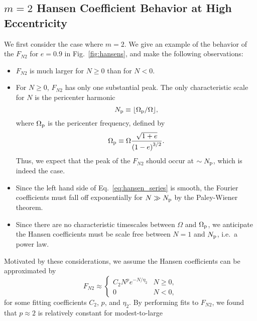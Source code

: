 \documentclass[
        fleqn,
        usenatbib,
    ]{mnras}
\newcommand*{\p}[1]{\left(#1\right)}
\begin{document}
\subsection{$m=2$ Hansen Coefficient Behavior at High Eccentricity}

We first consider the case where $m = 2$. We give an example of the behavior of
the $F_{N2}$ for $e = 0.9$ in Fig.~\ref{fig:hansens}, and make the following
observations:
\begin{itemize}
    \item $F_{N2}$ is much larger for $N \geq 0$ than for $N < 0$.

    \item For $N \geq 0$, $F_{N2}$ has only one substantial peak.
        The only characteristic scale for $N$ is the pericenter harmonic
        \begin{equation}
            N_{\rm p} \equiv \lfloor \Omega_{\rm p} / \Omega\rfloor,
        \end{equation}
        where $\Omega_{\rm p}$ is the pericenter frequency, defined by
        \begin{equation}
            \Omega_{\rm p} \equiv \Omega \frac{\sqrt{1 + e}}{\p{1 - e}^{3/2}}.
        \end{equation}
        Thus, we expect that the peak of the $F_{N2}$ should occur at $\sim
        N_{\rm p}$, which is indeed the case.

    \item Since the left hand side of Eq.~\eqref{eq:hansen_series} is smooth,
        the Fourier coefficients must fall off exponentially for $N \gg N_{\rm
        p}$ by the Paley-Wiener theorem.

    \item Since there are no characteristic timescales between $\Omega$ and
        $\Omega_{\rm p}$, we anticipate the Hansen coefficients must be scale
        free between $N = 1$ and $N_{\rm p}$, i.e.\ a power law.
\end{itemize}
Motivated by these considerations, we assume the Hansen coefficients can be
approximated by
\begin{equation}
    F_{N2} \approx
    \begin{cases}
        C_2 N^{p}e^{-N/\eta_2} & N \geq 0,\\
        0 & N < 0,
    \end{cases}\label{eq:fn2_fit}
\end{equation}
for some fitting coefficients $C_2$, $p$, and $\eta_2$. By performing fits to
$F_{N2}$, we found that $p \approx 2$ is relatively constant for modest-to-large
\end{document}
